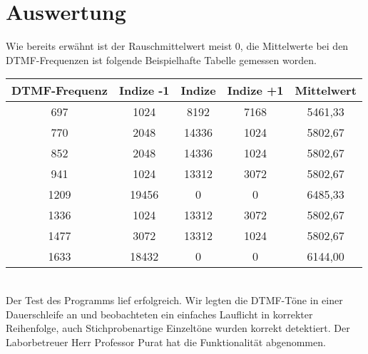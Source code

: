 \section{Auswertung}\label{ADTMF}
Wie bereits erwähnt ist der Rauschmittelwert meist 0, die Mittelwerte bei den DTMF-Frequenzen ist folgende Beispielhafte Tabelle gemessen worden.\\
\begin{tabular}{|c|c|c|c|c|}
\hline 
DTMF-Frequenz & Indize -1 & Indize & Indize +1 & Mittelwert \\ 
\hline 
697 & 1024
 & 8192
 & 7168
 & 5461,33
 \\ 
\hline 
770 & 2048
 & 14336
 & 1024
 & 5802,67
 \\ 
\hline 
852 & 2048
 & 14336
 & 1024
 & 5802,67 \\ 
\hline 
941 &1024
 & 13312
 & 3072
 & 5802,67
\\ 
\hline 
1209 &19456
 & 0 & 0 & 6485,33
 \\ 
\hline 
1336 & 1024
 & 13312
 & 3072
 & 5802,67
 \\ 
\hline 
1477 & 3072
 & 13312
 & 1024
& 5802,67
 \\ 
\hline 
1633 & 18432
 & 0 &0 &6144,00
 \\ 
\hline 
\end{tabular} \\
Der Test des Programms lief erfolgreich. Wir legten die DTMF-Töne in einer Dauerschleife an und beobachteten ein einfaches Lauflicht in korrekter Reihenfolge, auch Stichprobenartige Einzeltöne wurden korrekt detektiert. Der Laborbetreuer Herr Professor Purat hat die Funktionalität abgenommen.\\